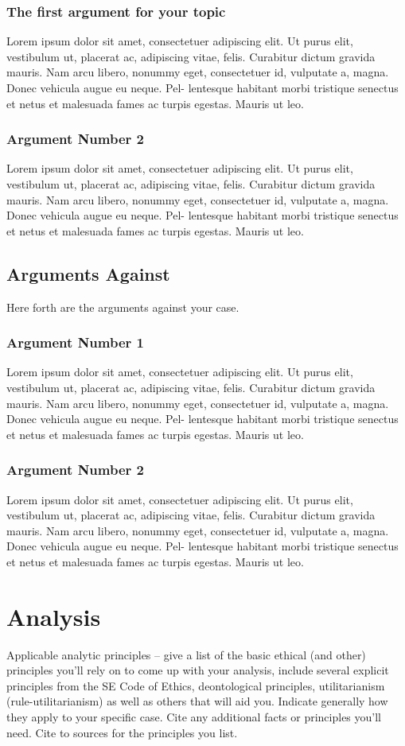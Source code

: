 \documentclass[12pt]{article}
\begin{document}
\begin{multicols}{2}
\subsubsection{The first argument for your topic}
Lorem ipsum dolor sit amet, consectetuer adipiscing elit. Ut purus elit, vestibulum ut, placerat ac, adipiscing vitae, felis. Curabitur dictum gravida mauris. Nam arcu libero, nonummy eget, consectetuer id, vulputate a, magna. Donec vehicula augue eu neque. Pel- lentesque habitant morbi tristique senectus et netus et malesuada fames ac turpis egestas. Mauris ut leo.
\subsubsection{Argument Number 2}
Lorem ipsum dolor sit amet, consectetuer adipiscing elit. Ut purus elit, vestibulum ut, placerat ac, adipiscing vitae, felis. Curabitur dictum gravida mauris. Nam arcu libero, nonummy eget, consectetuer id, vulputate a, magna. Donec vehicula augue eu neque. Pel- lentesque habitant morbi tristique senectus et netus et malesuada fames ac turpis egestas. Mauris ut leo.
\subsection{Arguments Against}
Here forth are the arguments against your case.
\subsubsection{Argument Number 1}
Lorem ipsum dolor sit amet, consectetuer adipiscing elit. Ut purus elit, vestibulum ut, placerat ac, adipiscing vitae, felis. Curabitur dictum gravida mauris. Nam arcu libero, nonummy eget, consectetuer id, vulputate a, magna. Donec vehicula augue eu neque. Pel- lentesque habitant morbi tristique senectus et netus et malesuada fames ac turpis egestas. Mauris ut leo.
\subsubsection{Argument Number 2}
Lorem ipsum dolor sit amet, consectetuer adipiscing elit. Ut purus elit, vestibulum ut, placerat ac, adipiscing vitae, felis. Curabitur dictum gravida mauris. Nam arcu libero, nonummy eget, consectetuer id, vulputate a, magna. Donec vehicula augue eu neque. Pel- lentesque habitant morbi tristique senectus et netus et malesuada fames ac turpis egestas. Mauris ut leo.
\section{Analysis}
Applicable analytic principles -- give a list of the basic ethical (and other) principles you'll rely on to come up with your analysis, include several explicit principles from the SE Code of Ethics, deontological principles, utilitarianism (rule-utilitarianism) as well as others that will aid you. Indicate generally how they apply to your specific case. Cite any additional facts or principles you'll need. Cite to sources for the principles you list.  \cite{handout}


\end{multicols}
\end{document}
